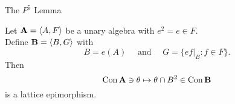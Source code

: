\begin{frame}[fragile,label=PAP,shrink=5]{The $P^5$ Lemma}
  \begin{lemma}[\PAP]
    Let $\mathbf{A} = \langle A, F\rangle$ be a unary algebra with 
    $e^2=e\in F$.\\[4pt]
    Define $\mathbf{B} = \langle B, G\rangle$ with
    \[
    B= e(A) \quad \text{ and } \quad G = \{ef\rvert_B : f\in F\}.
    \]
    Then 
    \[
    \mathrm{Con\,} \mathbf{A} \ni \theta \mapsto \theta \cap B^2 \in \mathrm{Con\,} \mathbf{B}
    \]
    is a lattice epimorphism.
  \end{lemma}
\end{frame}

